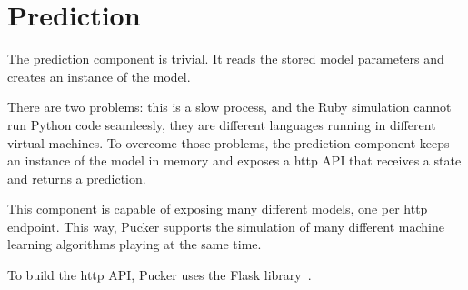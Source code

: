 \section{Prediction}
\label{sec:prediction}

The prediction component is trivial. It reads the stored model parameters and creates an instance of the model.

There are two problems: this is a slow process, and the Ruby simulation cannot run Python code seamleesly, they are different languages running in different virtual machines. To overcome those problems, the prediction component keeps an instance of the model in memory and exposes a http API that receives a state and returns a prediction.

This component is capable of exposing many different models, one per http endpoint. This way, Pucker supports the simulation of many different machine learning algorithms playing at the same time.

To build the http API, Pucker uses the Flask library~\cite{flask}.


